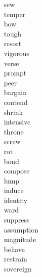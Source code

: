 \documentclass[b5paper, 11pt]{ctexart}
\begin{document}
\begin{multicols*}{3}
\begin{description}
\item[sew]

\item[temper]

\item[bow]

\item[tough]

\item[resort]

\item[vigorous]

\item[verse]

\item[prompt]

\item[peer]

\item[bargain]

\item[contend]

\item[shrink]

\item[intensive]

\item[throne]

\item[screw]

\item[rot]

\item[bond]

\item[compose]

\item[lump]

\item[induce]

\item[identity]

\item[ward]

\item[suppress]

\item[assumption]

\item[magnitude]

\item[behave]

\item[restrain]

\item[sovereign]


\end{description}
\end{multicols*}
\end{document}
